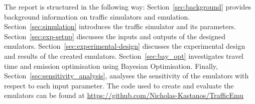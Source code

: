 The report is structured in the following way: Section~\ref{sec:background} provides background information on traffic simulators and emulation. Section~\ref{sec:simulation} introduces the traffic simulator and its parameters. Section~\ref{sec:exp-setup} discusses the inputs and outputs of the designed emulators. Section~\ref{sec:experimental-design} discusses the experimental design and results of the created emulators. Section~\ref{sec:bay_opt} investigates travel time and emission optimisation using Bayesian Optimisation. Finally, Section~\ref{sec:sensitivity_analysis}, analyses the sensitivity of the emulators with respect to each input parameter. The code used to create and evaluate the emulators can be found at \url{https://github.com/Nicholas-Kastanos/TrafficEmu}